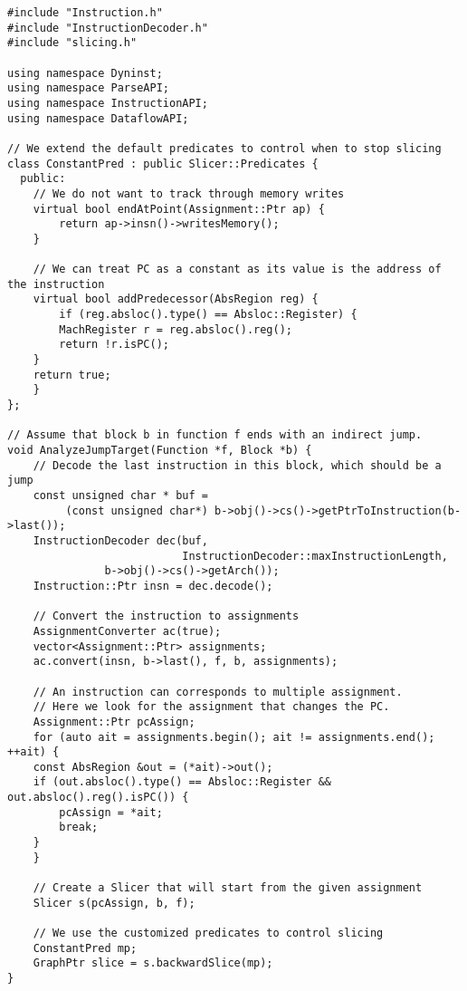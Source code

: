 \lstset{numbers=left, numberstyle=\tiny, stepnumber=5, numbersep=5pt}
\lstset{showstringspaces=false}
\begin{lstlisting}
#include "Instruction.h"
#include "InstructionDecoder.h"
#include "slicing.h"

using namespace Dyninst;
using namespace ParseAPI;
using namespace InstructionAPI;
using namespace DataflowAPI;

// We extend the default predicates to control when to stop slicing
class ConstantPred : public Slicer::Predicates {
  public:
    // We do not want to track through memory writes
    virtual bool endAtPoint(Assignment::Ptr ap) {
        return ap->insn()->writesMemory();
    }

    // We can treat PC as a constant as its value is the address of the instruction
    virtual bool addPredecessor(AbsRegion reg) {
        if (reg.absloc().type() == Absloc::Register) {
	    MachRegister r = reg.absloc().reg();
	    return !r.isPC();
	} 
	return true;
    }
};

// Assume that block b in function f ends with an indirect jump.
void AnalyzeJumpTarget(Function *f, Block *b) {
    // Decode the last instruction in this block, which should be a jump
    const unsigned char * buf = 
         (const unsigned char*) b->obj()->cs()->getPtrToInstruction(b->last());
    InstructionDecoder dec(buf, 
                           InstructionDecoder::maxInstructionLength, 
			   b->obj()->cs()->getArch());
    Instruction::Ptr insn = dec.decode();
   
    // Convert the instruction to assignments
    AssignmentConverter ac(true);
    vector<Assignment::Ptr> assignments;
    ac.convert(insn, b->last(), f, b, assignments);

    // An instruction can corresponds to multiple assignment.
    // Here we look for the assignment that changes the PC.
    Assignment::Ptr pcAssign;
    for (auto ait = assignments.begin(); ait != assignments.end(); ++ait) {
	const AbsRegion &out = (*ait)->out();
	if (out.absloc().type() == Absloc::Register && out.absloc().reg().isPC()) {
	    pcAssign = *ait;
	    break;
	}
    }

    // Create a Slicer that will start from the given assignment
    Slicer s(pcAssign, b, f);

    // We use the customized predicates to control slicing
    ConstantPred mp;
    GraphPtr slice = s.backwardSlice(mp);
}
\end{lstlisting}


